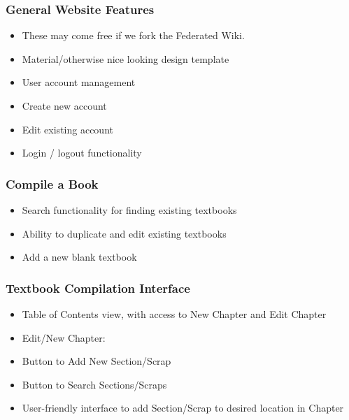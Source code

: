 \documentclass[letterpaper, 10pt, draftclsnofoot, compsoc, onecolumn]{IEEEtran}
\begin{document}
{{

\subsubsection[System feature 1: General Website Features]{\rmfamily\bfseries\color{black} General Website Features}

\begin{itemize}
\item These may come free if we fork the Federated Wiki.
\item Material/otherwise nice looking design template
\item User account management
\item Create new account
\item Edit existing account
\item Login / logout functionality
\end{itemize}

\subsubsection[System feature 2: Compile a book]{\rmfamily\bfseries\color{black} Compile a Book}
\begin{itemize}
\item Search functionality for finding existing textbooks
\item Ability to duplicate and edit existing textbooks
\item Add a new blank textbook
\end{itemize}

\subsubsection[System feature 3: Textbook Compilation Interface]{\rmfamily\bfseries\color{black} Textbook Compilation Interface}
\begin{itemize}
\item Table of Contents view, with access to New Chapter and Edit Chapter
\item Edit/New Chapter:
\item Button to Add New Section/Scrap
\item Button to Search Sections/Scraps
\item User-friendly interface to add Section/Scrap to desired location in Chapter
\end{itemize}

}}
\end{document}
